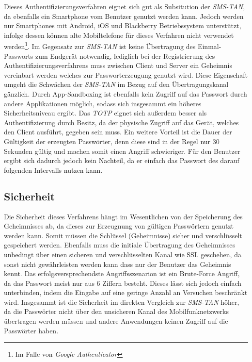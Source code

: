 \documentclass[11pt,a4paper,ngerman]{scrreprt}
\begin{document}
Dieses Authentifizierungsverfahren eignet sich gut als Subsitution der \textit{SMS-TAN}, da ebenfalls ein Smartphone vom Benutzer genutzt werden kann. Jedoch werden nur Smartphones mit Android, iOS und Blackberry Betriebssystem unterstützt, infolge dessen können alte Mobiltelefone für dieses Verfahren nicht verwendet werden\footnote{Im Falle von \textit{Google Authenticator}}. Im Gegensatz zur \textit{SMS-TAN} ist keine Übertragung des Einmal-Passworts zum Endgerät notwendig, lediglich bei der Registrierung des Authentifizierungsverfahrens muss zwischen Client und Server ein Geheimnis vereinbart werden welches zur Passworterzeugung genutzt wird. Diese Eigenschaft umgeht die Schwächen der \textit{SMS-TAN} im Bezug auf den Übertragungskanal gänzlich. Durch App-Sandboxing ist ebenfalls kein Zugriff auf das Passwort durch andere Applikationen möglich, sodass sich insgesammt ein höheres Sicherheitsniveau ergibt. Das \textit{TOTP} eignet sich außerdem besser als Authentifizierung durch Besitz, da der physische Zugriff auf das Gerät, welches den Client ausführt, gegeben sein muss. Ein weitere Vorteil ist die Dauer der Gültigkeit der erzeugten Passwörter, denn diese sind in der Regel nur 30 Sekunden gültig und machen somit einen Angriff schwieriger. Für den Benutzer ergibt sich dadurch jedoch kein Nachteil, da er einfach das Passwort des darauf folgenden Intervalls nutzen kann.

\subsection{Sicherheit}
Die Sicherheit dieses Verfahrens hängt im Wesentlichen von der Speicherung des Geheimnisses ab, da dieses zur Erzeugnung von gültigen Passwörtern genutzt werden kann. Somit müssen die Schlüssel (Geheimnisse) sicher und verschlüsselt gespeichert werden. Ebenfalls muss die initiale Übertragung des Geheimnisses unbedingt über einen sicheren und verschlüsselten Kanal wie SSL geschehen, da sonst nicht gewährleisten werden kann dass nur der Benutzer das Geheimnis kennt. Das erfolgsversprechendste Angriffsszenarion ist ein Brute-Force Angriff, da das Passwort meist nur aus 6 Ziffern besteht. Dieses lässt sich jedoch einfach unterbinden, indem die Eingabe auf eine geringe Anzahl an Versuchen beschränkt wird. Insgesammt ist die Sicherheit im direkten Vergleich zur \textit{SMS-TAN} höher, da die Passwörter nicht über den unsicheren Kanal des Mobilfunknetzwerks übertragen werden müssen und andere Anwendungen keinen Zugriff auf die Passwörter haben.
\end{document}
